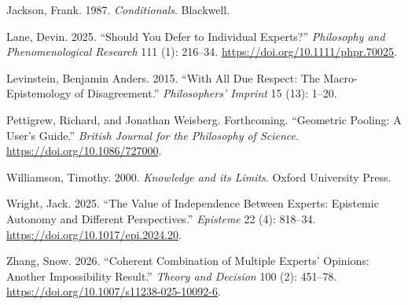 \documentclass[
  11pt,
  letterpaper,
  DIV=11,
  numbers=noendperiod,
  twoside]{scrartcl}
\newlength{\cslhangindent}
\newenvironment{CSLReferences}[2] %
 {\begin{list}{}{%
  \setlength{\itemindent}{0pt}
  \setlength{\leftmargin}{0pt}
  \setlength{\parsep}{0pt}
  \ifodd #1
   \setlength{\leftmargin}{\cslhangindent}
   \setlength{\itemindent}{-1\cslhangindent}
  \fi
  \setlength{\itemsep}{#2\baselineskip}}}
 {\end{list}}
\begin{document}
\begin{CSLReferences}{1}{1}
Jackson, Frank. 1987. \emph{Conditionals}. Blackwell.

Lane, Devin. 2025. {``Should You Defer to Individual Experts?''}
\emph{Philosophy and Phenomenological Research} 111 (1): 216--34.
\url{https://doi.org/10.1111/phpr.70025}.

Levinstein, Benjamin Anders. 2015. {``With All Due Respect: The
Macro-Epistemology of Disagreement.''} \emph{Philosophers' Imprint} 15
(13): 1--20.

Pettigrew, Richard, and Jonathan Weisberg. Forthcoming. {``Geometric
Pooling: A User's Guide.''} \emph{British Journal for the Philosophy of
Science}. \url{https://doi.org/10.1086/727000}.

Williamson, Timothy. 2000. \emph{{Knowledge and its Limits}}. Oxford
University Press.

Wright, Jack. 2025. {``The Value of Independence Between Experts:
Epistemic Autonomy and Different Perspectives.''} \emph{Episteme} 22
(4): 818--34. \url{https://doi.org/10.1017/epi.2024.20}.

Zhang, Snow. 2026. {``Coherent Combination of Multiple Experts'
Opinions: Another Impossibility Result.''} \emph{Theory and Decision}
100 (2): 451--78. \url{https://doi.org/10.1007/s11238-025-10092-6}.

\end{CSLReferences}



\noindent \vspace{2pt}
\end{document}
